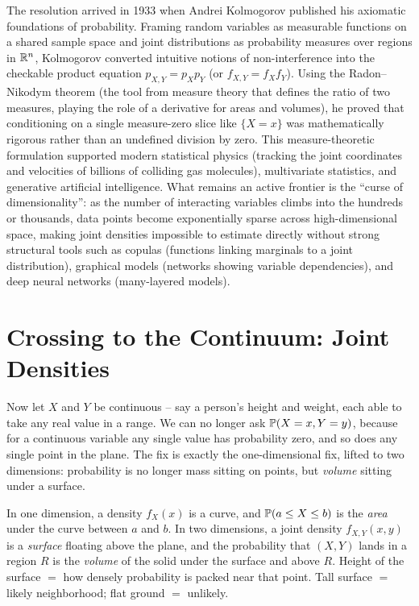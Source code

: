 \begin{historybox}
The resolution arrived in 1933 when Andrei Kolmogorov published his axiomatic
foundations of probability. Framing random variables as measurable functions on
a shared sample space and joint distributions as probability measures over
regions in $\R^n$, Kolmogorov converted intuitive notions of non-interference
into the checkable product equation $p_{X,Y} = p_X p_Y$ (or $f_{X,Y} = f_X f_Y$).
Using the Radon--Nikodym theorem (the tool from measure theory that defines the
ratio of two measures, playing the role of a derivative for areas and
volumes), he proved that conditioning on a single measure-zero slice like
$\{X=x\}$ was mathematically rigorous rather than an undefined division by zero.
This measure-theoretic formulation supported modern statistical physics (tracking the joint
coordinates and velocities of billions of colliding gas molecules), multivariate
statistics, and generative artificial intelligence. What remains an active
frontier is the ``curse of dimensionality'': as the number of interacting
variables climbs into the hundreds or thousands, data points become exponentially
sparse across high-dimensional space, making joint densities impossible to
estimate directly without strong structural tools such as copulas (functions linking marginals to a joint distribution), graphical
models (networks showing variable dependencies), and deep neural networks (many-layered models).
\end{historybox}

\section{Crossing to the Continuum: Joint Densities}
\label{ch13:joint-pdf}

Now let $X$ and $Y$ be continuous -- say a person's height and weight, each able
to take any real value in a range. We can no longer ask $\P(X=x, Y=y)$, because
for a continuous variable any single value has probability zero, and so does any
single point in the plane. The fix is exactly the one-dimensional fix, lifted to
two dimensions: probability is no longer mass sitting on points, but
\emph{volume} sitting under a surface.

\begin{intuitionbox}
In one dimension, a density $f_X(x)$ is a curve, and $\P(a\le X\le b)$ is the
\emph{area} under the curve between $a$ and $b$. In two dimensions, a joint
density $f_{X,Y}(x,y)$ is a \emph{surface} floating above the plane, and the
probability that $(X,Y)$ lands in a region $R$ is the \emph{volume} of the solid
under the surface and above $R$. Height of the surface $=$ how densely probability
is packed near that point. Tall surface $=$ likely neighborhood; flat ground
$=$ unlikely.
\end{intuitionbox}

